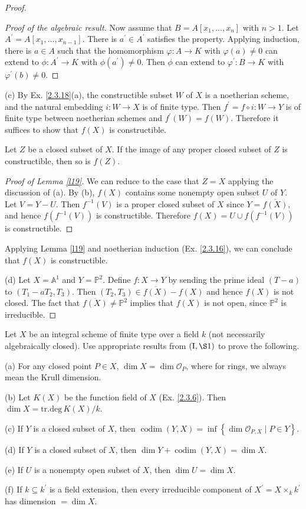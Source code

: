 \begin{proof}
\begin{proof}[Proof of the algebraic result]
		Now assume that $B=A[x_1,\dots,x_n]$ with $n>1$. Let $A^{\prime}=A[x_1,\dots,x_{n-1}]$. There is $a^{\prime}\in A^{\prime}$ satisfies the property. Applying induction, there is $a\in A$ such that the homomorphism $\varphi:A\to K$ with $\varphi(a)\neq0$ can extend to $\phi:A^{\prime}\to K$ with $\phi(a^{\prime})\neq0$. Then $\phi$ can extend to $\varphi^{\prime}:B\to K$ with $\varphi^{\prime}(b)\neq0$.
	\end{proof}
	(c) By Ex. \ref{2.3.18}(a), the constructible subset $W$ of $X$ is a noetherian scheme, and the natural embedding $i:W\to X$ is of finite type. Then $f^{\prime}=f\circ i:W\to Y$ is of finite type between noetherian schemes and $f^{\prime}(W)=f(W)$. Therefore it suffices to show that $f(X)$ is constructible.
	\begin{lm}
		\label{l19}
		Let $Z$ be a closed subset of $X$. If the image of any proper closed subset of $Z$ is constructible, then so is $f(Z)$.
	\end{lm}
	\begin{proof}[Proof of Lemma \ref{l19}]
		We can reduce to the case that $Z=X$ applying the discussion of (a). By (b), $f(X)$ contains some nonempty open subset $U$ of $Y$. Let $V=Y-U$. Then $f^{-1}(V)$ is a proper closed subset of $X$ since $Y=\overline{f(X)}$, and hence $f(f^{-1}(V))$ is constructible. Therefore $f(X)=U\cup f(f^{-1}(V))$ is constructible. 
	\end{proof}
	Applying Lemma \ref{l19} and noetherian induction (Ex. \ref{2.3.16}), we can conclude that $f(X)$ is constructible.
	
	(d) Let $X=\mathbb{A}^1$ and $Y=\mathbb{P}^2$. Define $f:X\to Y$ by sending the prime ideal $(T-a)$ to $(T_1-aT_2,T_3)$. Then $(T_2,T_3)\in\overline{f(X)}-f(X)$ and hence $f(X)$ is not closed. The fact that $\overline{f(X)}\neq\mathbb{P}^2$ implies that $f(X)$ is not open, since $\mathbb{P}^2$ is irreducible.
\end{proof}
\begin{exe}[Dimension]
	\label{2.3.20}
	Let $X$ be an integral scheme of finite type over a field $k$ (not necessarily algebraically closed). Use appropriate results from $(\mathrm{I}, \S 1)$ to prove the following.
	
	(a) For any closed point $P \in X$, $\dim X=\dim \mathcal{O}_{P}$, where for rings, we always mean the Krull dimension.
	
	(b) Let $K(X)$ be the function field of $X$ (Ex. \ref{2.3.6}). Then $\operatorname{dim} X=\mathrm{tr.deg}\,K(X) / k$.
	
	(c) If $Y$ is a closed subset of $X$, then $\operatorname{codim}(Y, X)=\inf \left\{\dim \mathcal{O}_{P, X} \mid P \in Y\right\}$.
	
	(d) If $Y$ is a closed subset of $X$, then $\dim Y+\operatorname{codim}(Y, X)=\dim X$.
	
	(e) If $U$ is a nonempty open subset of $X$, then $\dim U=\dim X$.
	
	(f) If $k \subseteq k^{\prime}$ is a field extension, then every irreducible component of $X^{\prime}=X \times_{k} k^{\prime}$ has dimension $=\dim X$.
\end{exe}
